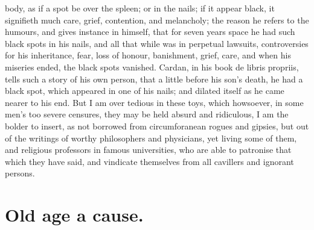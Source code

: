 {body, as if a spot be over the spleen; or in the nails; if it
appear black, it signifieth much care, grief, contention, and
melancholy; the reason he refers to the humours, and gives instance in
himself, that for seven years space he had such black spots in his
nails, and all that while was in perpetual lawsuits, controversies for
his inheritance, fear, loss of honour, banishment, grief, care, \etc{} and
when his miseries ended, the black spots vanished. Cardan, in his book
de libris propriis, tells such a story of his own person, that a little
before his son's death, he had a black spot, which appeared in one of
his nails; and dilated itself as he came nearer to his end. But I am
over tedious in these toys, which howsoever, in some men's too severe
censures, they may be held absurd and ridiculous, I am the bolder to
insert, as not borrowed from circumforanean rogues and gipsies, but out
of the writings of worthy philosophers and physicians, yet living some
of them, and religious professors in famous universities, who are able
to patronise that which they have said, and vindicate themselves from
all cavillers and ignorant persons.

\section{Old age a cause.}

}
